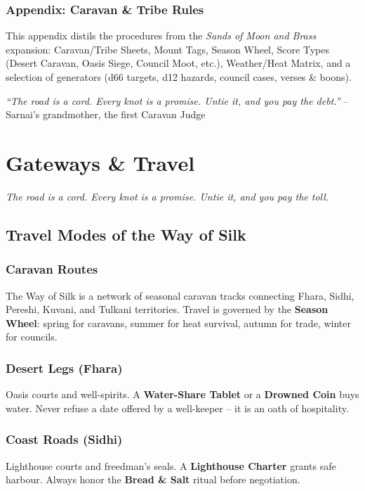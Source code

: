 \documentclass[12pt,oneside]{book}
\begin{document}
\subsection*{Appendix: Caravan \& Tribe Rules}
This appendix distils the procedures from the \textit{Sands of Moon and Brass} expansion: Caravan/Tribe Sheets, Mount Tags, Season Wheel, Score Types (Desert Caravan, Oasis Siege, Council Moot, etc.), Weather/Heat Matrix, and a selection of generators (d66 targets, d12 hazards, council cases, verses & boons).

\vspace{1em}
\noindent\textit{``The road is a cord. Every knot is a promise. Untie it, and you pay the debt.''} -- Sarnai's grandmother, the first Caravan Judge

\mainmatter


\chapter{Gateways \& Travel}
\emph{The road is a cord. Every knot is a promise. Untie it, and you pay the toll.}

\section*{Travel Modes of the Way of Silk}

\subsection*{Caravan Routes}
The Way of Silk is a network of seasonal caravan tracks connecting Fhara, Sidhi, Pereshi, Kuvani, and Tulkani territories. Travel is governed by the \textbf{Season Wheel}: spring for caravans, summer for heat survival, autumn for trade, winter for councils.

\subsection*{Desert Legs (Fhara)}
Oasis courts and well-spirits. A \textbf{Water-Share Tablet} or a \textbf{Drowned Coin} buys water. Never refuse a date offered by a well-keeper -- it is an oath of hospitality.

\subsection*{Coast Roads (Sidhi)}
Lighthouse courts and freedman's seals. A \textbf{Lighthouse Charter} grants safe harbour. Always honor the \textbf{Bread \& Salt} ritual before negotiation.
\end{document}
